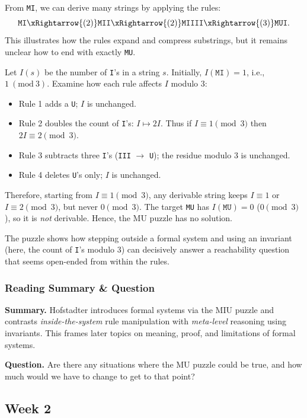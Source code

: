 \documentclass{article}
\theoremstyle{theorem}
\theoremstyle{definition}
\theoremstyle{remark}
\begin{document}
From \texttt{MI}, we can derive many strings by applying the rules:
\[
\texttt{MI} \xRightarrow{(2)} \texttt{MII} \xRightarrow{(2)} \texttt{MIIII} \xRightarrow{(3)} \texttt{MUI}.
\]
This illustrates how the rules expand and compress substrings, but it remains unclear how to end with exactly \texttt{MU}.

Let $I(s)$ be the number of \texttt{I}'s in a string $s$. Initially, $I(\texttt{MI})=1$, i.e., $1\ (\mathrm{mod}\ 3)$. Examine how each rule affects $I$ modulo $3$:
\begin{itemize}
  \item Rule 1 adds a \texttt{U}; $I$ is unchanged.
  \item Rule 2 doubles the count of \texttt{I}'s: $I \mapsto 2I$. Thus if $I \equiv 1\pmod{3}$ then $2I \equiv 2\pmod{3}$.
  \item Rule 3 subtracts three \texttt{I}'s (\texttt{III} $\to$ \texttt{U}); the residue modulo $3$ is unchanged.
  \item Rule 4 deletes \texttt{U}'s only; $I$ is unchanged.
\end{itemize}
Therefore, starting from $I \equiv 1\pmod{3}$, any derivable string keeps $I \equiv 1$ or $I \equiv 2\pmod{3}$, but never $0\pmod{3}$. The target \texttt{MU} has $I(\texttt{MU})=0$ ($0\pmod{3}$), so it is \emph{not} derivable. Hence, the MU puzzle has no solution.

The puzzle shows how stepping outside a formal system and using an invariant (here, the count of \texttt{I}'s modulo 3) can decisively answer a reachability question that seems open-ended from within the rules.

\subsubsection*{Reading Summary \& Question}
\textbf{Summary.} Hofstadter introduces formal systems via the MIU puzzle and contrasts \emph{inside-the-system} rule manipulation with \emph{meta-level} reasoning using invariants. This frames later topics on meaning, proof, and limitations of formal systems.

\textbf{Question.} Are there any situations where the MU puzzle could be true, and how much would we have to change to get to that point?

\subsection{Week 2}\label{sec:week2}
\smallskip
\end{document}
